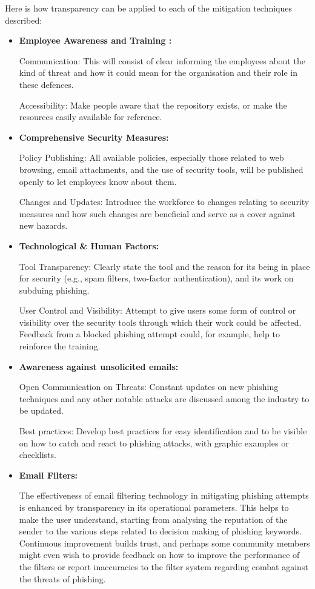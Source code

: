 Here is how transparency can be applied to each of the mitigation techniques described:
\begin{itemize}
    \item \textbf{Employee Awareness and Training :} 
    
    Communication: This will consist of clear informing the employees about the kind of threat and how it could mean for the organisation and their role in these defences.
    
    Accessibility: Make people aware that the repository exists, or make the resources easily available for reference. 

     \item \textbf{Comprehensive Security Measures: }
     
     Policy Publishing: All available policies, especially those related to web browsing, email attachments, and the use of security tools, will be published openly to let employees know about them.
     

    Changes and Updates: Introduce the workforce to changes relating to security measures and how such changes are beneficial and serve as a cover against new hazards.

     \item \textbf{Technological \& Human Factors: } 
     
     Tool Transparency: Clearly state the tool and the reason for its being in place for security (e.g., spam filters, two-factor authentication), and its work on subduing phishing. 
     
    User Control and Visibility: Attempt to give users some form of control or visibility over the security tools through which their work could be affected. Feedback from a blocked phishing attempt could, for example, help to reinforce the training.

     \item \textbf{Awareness against unsolicited emails:  } 
     
     Open Communication on Threats: Constant updates on new phishing techniques and any other notable attacks are discussed among the industry to be updated.
     
    Best practices: Develop best practices for easy identification and to be visible on how to catch and react to phishing attacks, with graphic examples or checklists.

    \item \textbf{Email Filters:} 

    The effectiveness of email filtering technology in mitigating phishing attempts is enhanced by transparency in its operational parameters. This helps to make the user understand, starting from analysing the reputation of the sender to the various steps related to decision making of phishing keywords. Continuous improvement builds trust, and perhaps some community members might even wish to provide feedback on how to improve the performance of the filters or report inaccuracies to the filter system regarding combat against the threats of phishing.


\end{itemize}
